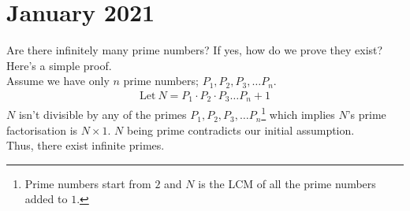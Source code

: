 \section{January 2021}
{}
\thispagestyle{empty}
\newpage
\begin{mathbox}{}
{Are there infinitely many prime numbers? If yes, how do we prove they exist?\\
Here's a simple proof.\\
{Assume} we have only $n$ prime numbers; $P_1, P_2, P_3, \dots P_n$.
\begin{align*}
\text{Let}~N = P_1 \cdot P_2 \cdot P_3 \dots P_n + 1
\end{align*}
$N$ {isn't divisible} by any of the primes $P_1, P_2, P_3, \dots P_n$\footnote{Prime numbers start from $2$ and $N$ is the LCM of all the prime numbers added to $1$.}  which implies $N$'s {prime factorisation} is $N \times 1$. $N$ being prime {contradicts} our initial assumption.\\
Thus, there exist infinite primes.}
\end{mathbox}
